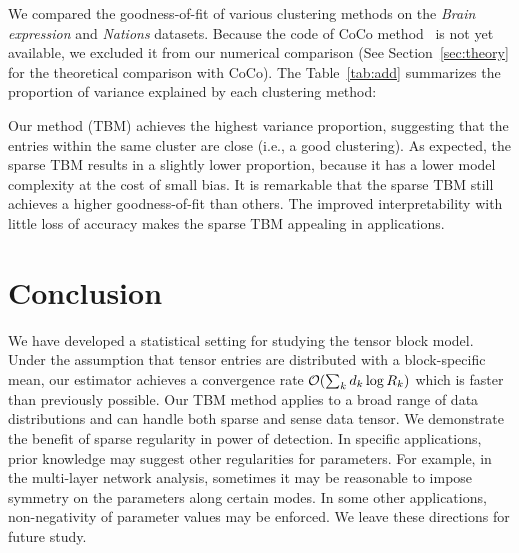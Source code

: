 \documentclass[11pt]{article}
\theoremstyle{plain}
\theoremstyle{definition}
\begin{document}
We compared the goodness-of-fit of various clustering methods on the \emph{Brain expression} and \emph{Nations} datasets. Because the code of CoCo method~\cite{chi2018provable} is not yet available, we excluded it from our numerical comparison (See Section~\ref{sec:theory} for the theoretical comparison with CoCo). The Table~\ref{tab:add} summarizes the proportion of variance explained by each clustering method:

\begin{table}[h!]
\centering
\caption{Comparison of goodness-of-fit in the \emph{Brain} expression and \emph{Nations} datasets.}\label{tab:add}
\end{table}


Our method (TBM) achieves the highest variance proportion, suggesting that the entries within the same cluster are close (i.e., a good clustering). As expected, the sparse TBM results in a slightly lower proportion, because it has a lower model complexity at the cost of small bias. It is remarkable that the sparse TBM still achieves a higher goodness-of-fit than others. The improved interpretability with little loss of accuracy makes the sparse TBM appealing in applications. 



\section{Conclusion}

We have developed a statistical setting for studying the tensor block model. Under the assumption that tensor entries are distributed with a block-specific mean, our estimator achieves a convergence rate $\mathcal{O}( \sum_kd_k\log R_k)$ which is faster than previously possible. Our TBM method applies to a broad range of data distributions and can handle both sparse and sense data tensor. We demonstrate the benefit of sparse regularity in power of detection. In specific applications, prior knowledge may suggest other regularities for parameters. For example, in the multi-layer network analysis, sometimes it may be reasonable to impose symmetry on the parameters along certain modes. In some other applications, non-negativity of parameter values may be enforced. We leave these directions for future study. 
\end{document}
